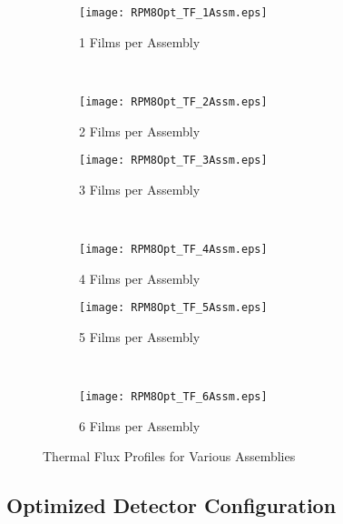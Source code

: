 \begin{figure}
	\centering
	\begin{subfigure}[b]{0.43\textwidth}
		\centering
		\texttt{[image: RPM8Opt\_TF\_1Assm.eps]}
    \caption{1 Films per Assembly}
	\end{subfigure}%
	~
	\begin{subfigure}[b]{0.43\textwidth}
		\centering
		\texttt{[image: RPM8Opt\_TF\_2Assm.eps]}
    \caption{2 Films per Assembly}
	\end{subfigure}	
	
  \begin{subfigure}[b]{0.43\textwidth}
		\centering
		\texttt{[image: RPM8Opt\_TF\_3Assm.eps]}
    \caption{3 Films per Assembly}
	\end{subfigure}%
	~
	\begin{subfigure}[b]{0.43\textwidth}
		\centering
		\texttt{[image: RPM8Opt\_TF\_4Assm.eps]}
    \caption{4 Films per Assembly}
	\end{subfigure}	

	\begin{subfigure}[b]{0.43\textwidth}
		\centering
		\texttt{[image: RPM8Opt\_TF\_5Assm.eps]}
    \caption{5 Films per Assembly}
	\end{subfigure}%
	~
	\begin{subfigure}[b]{0.43\textwidth}
		\centering
		\texttt{[image: RPM8Opt\_TF\_6Assm.eps]}
    \caption{6 Films per Assembly}
	\end{subfigure}

	\caption{Thermal Flux Profiles for Various Assemblies}
	\label{fig:ThermalFlux}
\end{figure}
\subsection{Optimized Detector Configuration}
